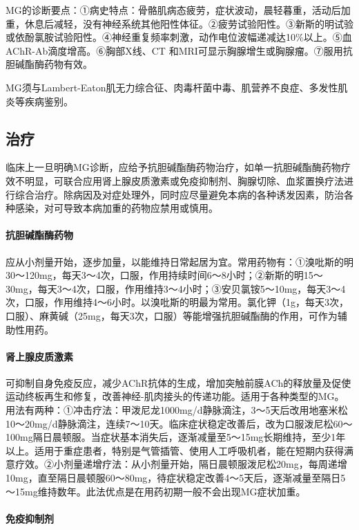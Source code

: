 MG的诊断要点：①病史特点：骨骼肌病态疲劳，症状波动，晨轻暮重，活动后加重，休息后减轻，没有神经系统其他阳性体征。②疲劳试验阳性。③新斯的明试验或依酚氯胺试验阳性。④神经重复频率刺激，动作电位波幅递减达10\%以上。⑤血AChR-Ab滴度增高。⑥胸部X线、CT
和MRI可显示胸腺增生或胸腺瘤。⑦服用抗胆碱酯酶药物有效。

MG须与Lambert-Eaton肌无力综合征、肉毒杆菌中毒、肌营养不良症、多发性肌炎等疾病鉴别。

\subsection{治疗}

临床上一旦明确MG诊断，应给予抗胆碱酯酶药物治疗，如单一抗胆碱酯酶药物疗效不明显，可联合应用肾上腺皮质激素或免疫抑制剂、胸腺切除、血浆置换疗法进行综合治疗。除病因及对症处理外，同时应尽量避免本病的各种诱发因素，防治各种感染，对可导致本病加重的药物应禁用或慎用。

\paragraph{抗胆碱酯酶药物}

应从小剂量开始，逐步加量，以能维持日常起居为宜。常用药物有：①溴吡斯的明30～120mg，每天3～4次，口服，作用持续时间6～8小时；②新斯的明15～30mg，每天3～4次，口服，作用维持3～4小时；③安贝氯铵5～10mg，每天3～4次，口服，作用维持4～6小时。以溴吡斯的明最为常用。氯化钾（1g，每天3次，口服）、麻黄碱（25mg，每天3次，口服）等能增强抗胆碱酯酶的作用，可作为辅助性用药。

\paragraph{肾上腺皮质激素}

可抑制自身免疫反应，减少AChR抗体的生成，增加突触前膜ACh的释放量及促使运动终板再生和修复，改善神经-肌肉接头的传递功能。适用于各种类型的MG。用法有两种：①冲击疗法：甲泼尼龙1000mg/d静脉滴注，3～5天后改用地塞米松10～20mg/d静脉滴注，连续7～10天。临床症状稳定改善后，改为口服泼尼松60～100mg隔日晨顿服。当症状基本消失后，逐渐减量至5～15mg长期维持，至少1年以上。适用于重症患者，特别是气管插管、使用人工呼吸机者，能在短期内获得满意疗效。②小剂量递增疗法：从小剂量开始，隔日晨顿服泼尼松20mg，每周递增10mg，直至隔日晨顿服60～80mg，待症状稳定改善4～5天后，逐渐减量至隔日5～15mg维持数年。此法优点是在用药初期一般不会出现MG症状加重。

\paragraph{免疫抑制剂}


